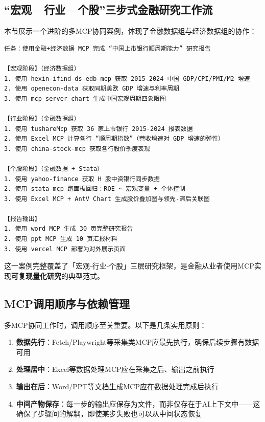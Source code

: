 \subsection{“宏观—行业—个股”三步式金融研究工作流}

本节展示一个进阶的多MCP协同案例，体现了金融数据组与经济数据组的协作：

\begin{lstlisting}
任务：使用金融+经济数据 MCP 完成 “中国上市银行顺周期能力” 研究报告

【宏观阶段】（经济数据组）
1. 使用 hexin-ifind-ds-edb-mcp 获取 2015-2024 中国 GDP/CPI/PMI/M2 增速
2. 使用 openecon-data 获取同期美欧 GDP 增速与利率周期
3. 使用 mcp-server-chart 生成中国宏观周期四象限图

【行业阶段】（金融数据组）
1. 使用 tushareMcp 获取 36 家上市银行 2015-2024 报表数据
2. 使用 Excel MCP 计算各行 “顺周期指数”（营收增速对 GDP 增速的弹性）
3. 使用 china-stock-mcp 获取各行股价季度表现

【个股阶段】（金融数据 + Stata）
1. 使用 yahoo-finance 获取 H 股中资银行同步数据
2. 使用 stata-mcp 跑面板回归：ROE ~ 宏观变量 + 个体控制
3. 使用 Excel MCP + AntV Chart 生成股价叠加图与领先-滞后关联图

【报告输出】
1. 使用 word MCP 生成 30 页完整研究报告
2. 使用 ppt MCP 生成 10 页汇报材料
3. 使用 vercel MCP 部署为对外展示页面
\end{lstlisting}

这一案例完整覆盖了「宏观-行业-个股」三层研究框架，是金融从业者使用MCP实现\textbf{可复现量化研究}的典型范式。

\subsection{MCP调用顺序与依赖管理}

多MCP协同工作时，调用顺序至关重要。以下是几条实用原则：

\begin{enumerate}[leftmargin=2em]
  \item \textbf{数据先行}：Fetch/Playwright等采集类MCP应最先执行，确保后续步骤有数据可用
  \item \textbf{处理居中}：Excel等数据处理MCP应在采集之后、输出之前执行
  \item \textbf{输出在后}：Word/PPT等文档生成MCP应在数据处理完成后执行
  \item \textbf{中间产物保存}：每一步的输出应保存为文件，而非仅存在于AI上下文中——这确保了步骤间的解耦，即使某步失败也可以从中间状态恢复
\end{enumerate}

